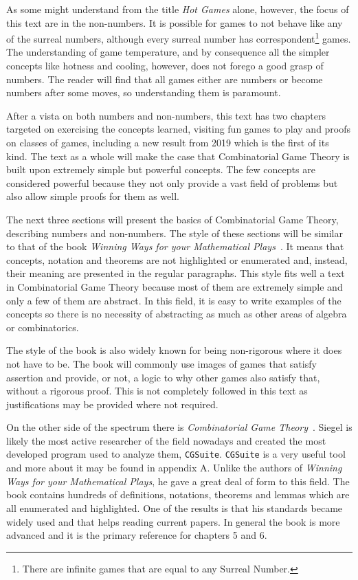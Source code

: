 As some might understand from the title \textit{Hot Games} alone, however, the focus of this text are in the non-numbers. It is possible for games to not behave like any of the surreal numbers, although every surreal number has correspondent\footnote{There are infinite games that are equal to any Surreal Number.} games. The understanding of game temperature, and by consequence all the simpler concepts like hotness and cooling, however, does not forego a good grasp of numbers. The reader will find that all games either are numbers or become numbers after some moves, so understanding them is paramount.

After a vista on both numbers and non-numbers, this text has two chapters targeted on exercising the concepts learned, visiting fun games to play and proofs on classes of games, including a new result from 2019 which is the first of its kind. The text as a whole will make the case that Combinatorial Game Theory is built upon extremely simple but powerful concepts. The few concepts are considered powerful because they not only provide a vast field of problems but also allow simple proofs for them as well.

The next three sections will present the basics of Combinatorial Game Theory, describing numbers and non-numbers. The style of these sections will be similar to that of the book \textit{Winning Ways for your Mathematical Plays}~\cite{WW}. It means that concepts, notation and theorems are not highlighted or enumerated and, instead, their meaning are presented in the regular paragraphs. This style fits well a text in Combinatorial Game Theory because most of them are extremely simple and only a few of them are abstract. In this field, it is easy to write examples of the concepts so there is no necessity of abstracting as much as other areas of algebra or combinatorics.

The style of the book is also widely known for being non-rigorous where it does not have to be. The book will commonly use images of games that satisfy assertion and provide, or not, a logic to why other games also satisfy that, without a rigorous proof. This is not completely followed in this text as justifications may be provided where not required. 

On the other side of the spectrum there is \textit{Combinatorial Game Theory}~\cite{CGT}. Siegel is likely the most active researcher of the field nowadays and created the most developed program used to analyze them, \texttt{CGSuite}. \texttt{CGSuite} is a very useful tool and more about it may be found in appendix A. Unlike the authors of \textit{Winning Ways for your Mathematical Plays}, he gave a great deal of form to this field. The book contains hundreds of definitions, notations, theorems and lemmas which are all enumerated and highlighted. One of the results is that his standards became widely used and that helps reading current papers. In general the book is more advanced and it is the primary reference for chapters 5 and 6.

